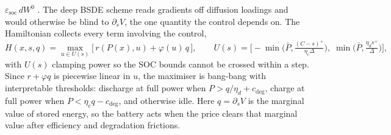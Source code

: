 \documentclass[11pt]{article}
\begin{document}
$\varepsilon_{\text{soc}}\,dW^0$ \cite{crandall1992}. The deep BSDE
scheme reads gradients off diffusion loadings and would otherwise be blind
to $\partial_s V$, the one quantity the control depends on. The
Hamiltonian collects every term involving the control,
\begin{equation}
H(x, s, q) = \max_{u \in U(s)} \big[\, r(P(x), u) + \varphi(u)\,q \,\big],
\qquad
U(s) = \Big[-\min\big(\bar P, \tfrac{(C-s)^+}{\eta_c \Delta}\big),\;
\min\big(\bar P, \tfrac{\eta_d s^+}{\Delta}\big)\Big],
\label{eq:hamiltonian}
\end{equation}
with $U(s)$ clamping power so the SOC bounds cannot be crossed within a
step. Since $r + \varphi q$ is piecewise linear in $u$, the maximiser is
bang-bang with interpretable thresholds: discharge at full power when
$P > q/\eta_d + c_{\deg}$, charge at full power when
$P < \eta_c q - c_{\deg}$, and otherwise idle. Here $q = \partial_s V$ is
the marginal value of stored energy, so the battery acts when the
price clears that marginal value after efficiency and degradation
frictions.
\end{document}
